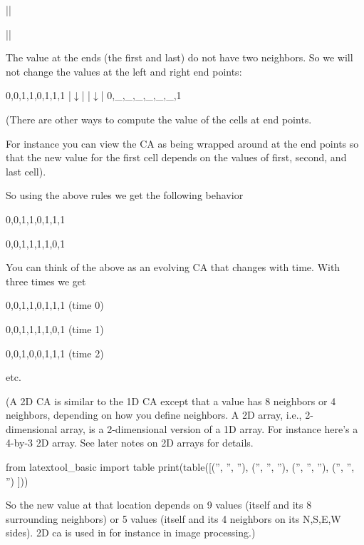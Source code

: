 \begin{consolethree}[escapeinside=||]
||



||
\end{consolethree}
The value at the ends (the first and last) do not have two neighbors. So we will not change the values at the left and right end points:

\begin{consolethree}[escapeinside=||]
0,0,1,1,0,1,1,1
|$\downarrow$|                 |$\downarrow$|
0,_,_,_,_,_,_,1
\end{consolethree}

(There are other ways to compute the value of the cells at end points.

For instance you can view the CA as being wrapped around at the end points so that the new value for the first cell depends on the values of first, second, and last cell).

So using the above rules we get the following behavior

\begin{console}
0,0,1,1,0,1,1,1

0,0,1,1,1,1,0,1
\end{console}

You can think of the above as an evolving CA that changes with time. With three times we get

\begin{console}
0,0,1,1,0,1,1,1 (time 0)

0,0,1,1,1,1,0,1 (time 1)

0,0,1,0,0,1,1,1 (time 2)
\end{console}

etc.

(A 2D CA is similar to the 1D CA except that a value has 8 neighbors or 4 neighbors, depending on how you define neighbors. A 2D array, i.e., 2-dimensional array, is a 2-dimensional version of a 1D array. For instance here's a 4-by-3 2D array. See later notes on 2D arrays for details.
\begin{python}
from latextool_basic import table
print(table([('', '', ''),
('', '', ''),
('', '', ''),
('', '', '')
]))
\end{python}
So the new value at that location depends on 9 values (itself and its 8 surrounding neighbors) or 5 values (itself and its 4 neighbors on its N,S,E,W sides). 2D ca is used in for instance in image processing.)

